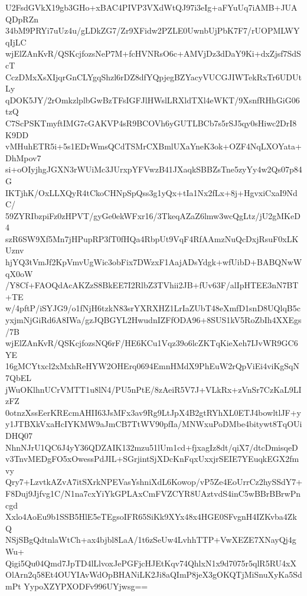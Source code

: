 U2FsdGVkX19gb3GHo+xBAC4PIVP3VXdWtQJ97i3eIg+aFYuUq7iAMB+JUAQDpRZn
34bM9PRYi7uUz4u/gLDkZG7/Zr9XFidw2PZLE0UwnbUjPbK7F7/rUOPMLWYqIjLC
wjElZAnKvR/QSKcjfozsNeP7M+fcHVNRsO6c+AMVjDz3dDaY9Ki+dxZjsf7SdScT
CczDMxXsXIjqrGnCLYgqShzl6rDZ8dfYQpjegBZYacyVUCGJIWTekRxTr6UDUtLy
qDOK5JY/2rOmkzlplbGwBzTFsIGFJlHWslLRXldTXl4eWKT/9XsnfRHhGiG06tzQ
C7ScPSKTmyftIMG7cGAKVP4sR9BCOVh6yGUTLBCb7s5rSJ5qy0sHiwc2DrI8K9DD
vMHuhETR5i+5s1EDrWmsQCdTSMrCXBmlUXaYneK3ok+OZF4NqLXOYata+DhMpov7
si+oOIyjhgJGXN3rWUiMc3JUrxpYFVwzB41JXaqkSBBZsTne5zyYy4w2Qs07p84G
IKTjhK/OxLLXQyR4tCkoCHNpSpQss3g1yQx+tIa1Nx2fLx+8j+HgvxiCxaI9NdC/
59ZYRIbzpiFz0zHPVT/gyGe0ekWFxr16/3TkeqAZaZ6lmw3wcQgLtz/jU2gMKeD4
szR6SW9Xf5Mn7jHPupRP3fT0fHQa4RbpUt9VqF4RfAAmzNuQcDxjRsuF0xLKUznv
hjYQ3tVmJf2KpVmvUgWic3obFix7DWzxF1AajADsYdgk+wfUibD+BABQNwWqX0oW
/Y8Cf+FAOQdAcAKZzS8BkEE7I2RlbZ3TVhii2JB+fUv63F/alIpHTEE3nN7BT+TE
w/4pftP/iSYJG9/o1fNjH6tzkN83srYXRXHZ1LrIaZUbT48eXmfD1snD8UQlqB5c
yxjmNjGiRd6A8IWa/gzJQBGYL2HwudnIZFfODA96+8SUS1kV5RoZbIh4XXEgs/7B
wjElZAnKvR/QSKcjfozsNQ6rF/HE6KCu1Vqz39o6lcZKTqKieXeh7IJvWR9GC6YE
16gMCYtxcl2xMxhReHYW2OHErq0694EmnHMdX9PhEuW2rQpViEi4viKgSqN7QbEL
jWuOKlhnUCrVMTT1u8lN4/PU5nPtE/8zAeiR5V7J+VLkRx+zVnSr7CzKaL9LIzFZ
0otnzXssEerKREcmAHII63JsMFx3av9Rg9LtJpX4B2gtRYhXL0ETJ4bowltlJF+y
y1JTBXkVxaHcIYKMW9aJmCB7TtWV90pfIa/MNWxuPoDMbe4bitywt8TqOUiDHQ07
NhnNJrU1QC6J4yY36QDZAIK132mzu51lUm1cd+fjxagIz8dt/qiX7/dtcDmisqeD
v3TnvMEDgFO5xOwessPdJIL+SGrjintSjXDcKnFqxUxxjrSEIE7YEuqkEGX2fmvy
Qry7+LzvtkAZvA7itSXrkNPEVasYshniXdL6Kowop/vP5Ze4EoUrrCz2hySSdY7+
F8Duj9Jjfvg1C/N1na7cxYiYkGPLAxCmFVZCYR8UAztvdS4inC5wBBrBBrwPncgd
Xxlo4AoEu9b1SSB5HlE5eTEgsoIFR65SiKk9XYx48x4HGE0SFvgnH4IZKvba4ZkQ
NSjSBgQdtnlaWtCh+ax4bjbl8LaA/1t6zSeUw4LvhhTTP+VwXEZE7XNayQj4gWu+
Qigi5Qu04Qmd7JpTD4lLlvoxJePGFjcHJEtKqv74QhlxN1x9d7075r5qlR5RU4xX
OlArn2q58Et4OUYIAvWdOpBHANiLK2Ji8aQImP8jeX3gOKQTjMiSnuXyKa5SdmPt
YypoXZYPXODFv996UYjwsg==

